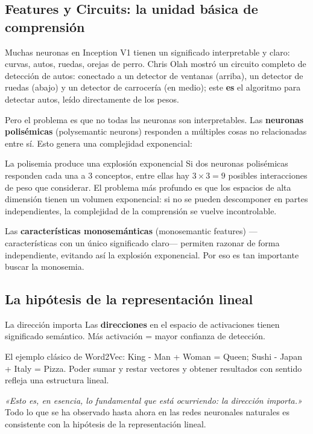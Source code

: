 \documentclass[a4paper]{article}
\begin{document}
\subsection{Features y Circuits: la unidad básica de comprensión}

Muchas neuronas en Inception V1 tienen un significado interpretable y claro: curvas, autos, ruedas, orejas de perro. Chris Olah mostró un circuito completo de detección de autos: conectado a un detector de ventanas (arriba), un detector de ruedas (abajo) y un detector de carrocería (en medio); este \textbf{es} el algoritmo para detectar autos, leído directamente de los pesos.

Pero el problema es que no todas las neuronas son interpretables. Las \textbf{neuronas polisémicas} (polysemantic neurons) responden a múltiples cosas no relacionadas entre sí. Esto genera una complejidad exponencial:

\begin{warningbox}{La polisemia produce una explosión exponencial}
Si dos neuronas polisémicas responden cada una a 3 conceptos, entre ellas hay $3 \times 3 = 9$ posibles interacciones de peso que considerar. El problema más profundo es que los espacios de alta dimensión tienen un volumen exponencial: si no se pueden descomponer en partes independientes, la complejidad de la comprensión se vuelve incontrolable.

Las \textbf{características monosemánticas} (monosemantic features) —características con un único significado claro— permiten razonar de forma independiente, evitando así la explosión exponencial. Por eso es tan importante buscar la monosemia.
\end{warningbox}

\subsection{La hipótesis de la representación lineal}

\begin{importantbox}{La dirección importa}
Las \textbf{direcciones} en el espacio de activaciones tienen significado semántico. Más activación = mayor confianza de detección.

El ejemplo clásico de Word2Vec: King - Man + Woman = Queen; Sushi - Japan + Italy = Pizza. Poder sumar y restar vectores y obtener resultados con sentido refleja una estructura lineal.

\textit{«Esto es, en esencia, lo fundamental que está ocurriendo: la dirección importa.»} Todo lo que se ha observado hasta ahora en las redes neuronales naturales es consistente con la hipótesis de la representación lineal.
\end{importantbox}
\end{document}
